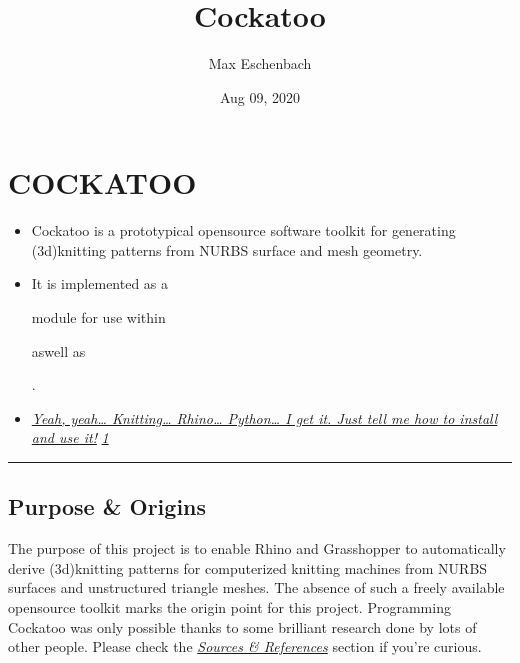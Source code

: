\documentclass[letterpaper,10pt,english]{sphinxmanual}
\title{Cockatoo}
\date{Aug 09, 2020}
\author{Max Eschenbach}
\begin{document}
\pagestyle{empty}
\sphinxmaketitle
\pagestyle{plain}
\sphinxtableofcontents
\pagestyle{normal}
\label{\detokenize{index::doc}}



\chapter{COCKATOO}
\label{\detokenize{README:cockatoo}}\label{\detokenize{README::doc}}\begin{itemize}
\item {} 
Cockatoo is a prototypical open\sphinxhyphen{}source software toolkit for
generating (3d\sphinxhyphen{})knitting patterns from NURBS surface and mesh
geometry.

\item {} 
It is implemented as a %
\begin{footnote}[6]\sphinxAtStartFootnote
{}
%
\end{footnote} module
for use within %
\begin{footnote}[7]\sphinxAtStartFootnote
{}
%
\end{footnote}
aswell as
%
\begin{footnote}[8]\sphinxAtStartFootnote
{}
%
\end{footnote}.

\item {} 
{\hyperref[\detokenize{README:installation}]{\emph{Yeah, yeah… Knitting… Rhino… Python… I get it. Just tell me
how to install and use it!}}} {\hyperref[\detokenize{README:misc}]{\emph{1}}}

\end{itemize}


\bigskip\hrule\bigskip



\section{Purpose \& Origins}
\label{\detokenize{README:purpose-origins}}\label{\detokenize{README:id1}}
The purpose of this project is to enable Rhino and Grasshopper to
automatically derive (3d\sphinxhyphen{})knitting patterns for computerized knitting
machines from NURBS surfaces and unstructured triangle meshes. The
absence of such a freely available open\sphinxhyphen{}source toolkit marks the origin
point for this project. Programming Cockatoo was only possible thanks to
some brilliant research done by lots of other people. Please check the
{\hyperref[\detokenize{README:sources--references}]{\emph{Sources \& References}}} section if you’re
curious.
\end{document}
